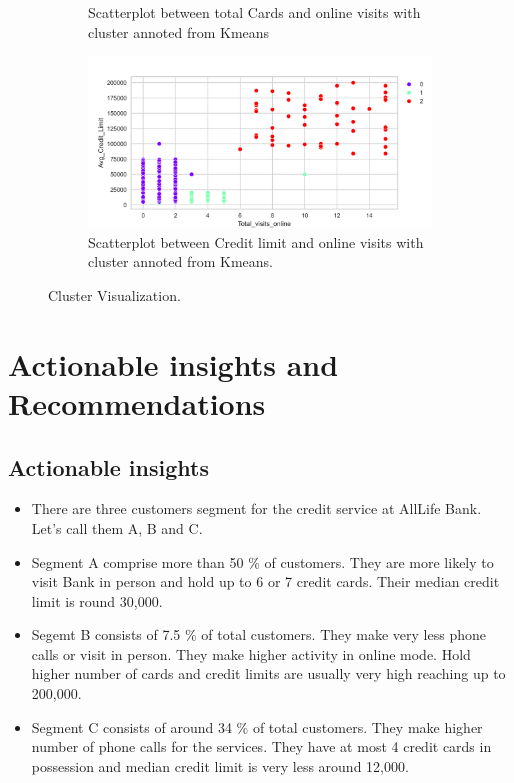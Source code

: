\documentclass[10pt,a4paper]{style}
\begin{document}
\begin{figure}[h]
\begin{subfigure}[t]{0.49\textwidth}
				\caption{Scatterplot between total Cards and online visits with cluster annoted from Kmeans}
				\label{fig:cluster_vis_cards_vs_online_visits_KM.}
			\end{subfigure}
			\hfill
			\begin{subfigure}[t]{0.49\textwidth}
				\includegraphics[width=\textwidth]{cluster_vis_credit_vs_online_visit_KM.png}
				\caption{Scatterplot between Credit limit and online visits with cluster annoted from Kmeans.}
				\label{fig:cluster_vis_credit_vs_online_visit_KM}
			\end{subfigure}
			\caption{Cluster Visualization.}
			\label{fig:Cluster Visualization}
		\end{figure}
	\newpage
	\section{Actionable insights and Recommendations}
	\subsection{Actionable insights}
	\begin{itemize}
		\item There are three customers segment for the credit service at AllLife Bank. Let's call them A, B and C. 
		\item Segment A comprise more than 50 \% of customers. They are more likely to visit Bank in person and hold up to 6 or 7 credit cards. Their median credit limit is round 30,000.
		\item Segemt B consists of 7.5 \% of total customers. They make very less phone calls or visit in person. They make higher activity in online mode. Hold higher number of cards and credit limits are usually very high reaching up to 200,000.
		\item Segment C consists of around 34 \% of total customers. They make higher number of phone calls for the services. They have at most 4 credit cards in possession and median credit limit is very less around 12,000.  
		
	\end{itemize}
	
\end{document}
